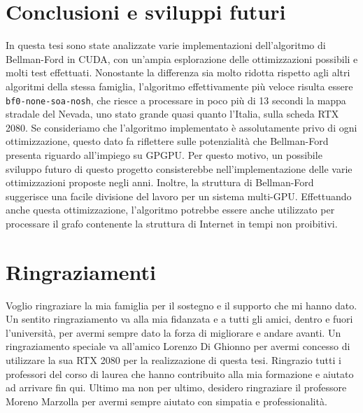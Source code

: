 \documentclass[12pt,a4paper,oneside]{book}
\begin{document}
	\chapter*{Conclusioni e sviluppi futuri}
	In questa tesi sono state analizzate varie implementazioni dell'algoritmo di Bellman-Ford in CUDA, con un'ampia esplorazione delle ottimizzazioni possibili e molti test effettuati. Nonostante la differenza sia molto ridotta rispetto agli altri algoritmi della stessa famiglia, l'algoritmo effettivamente più veloce risulta essere \texttt{bf0-none-soa-nosh}, che riesce a processare in poco più di 13 secondi la mappa stradale del Nevada, uno stato grande quasi quanto l'Italia, sulla scheda RTX 2080. Se consideriamo che l'algoritmo implementato è assolutamente privo di ogni ottimizzazione, questo dato fa riflettere sulle potenzialità che Bellman-Ford presenta riguardo all'impiego su GPGPU. Per questo motivo, un possibile sviluppo futuro di questo progetto consisterebbe nell'implementazione delle varie ottimizzazioni proposte negli anni. Inoltre, la struttura di Bellman-Ford suggerisce una facile divisione del lavoro per un sistema multi-GPU. Effettuando anche questa ottimizzazione, l'algoritmo potrebbe essere anche utilizzato per processare il grafo contenente la struttura di Internet in tempi non proibitivi.
	
	\printbibliography
	
	\chapter*{Ringraziamenti}
	Voglio ringraziare la mia famiglia per il sostegno e il supporto che mi hanno dato. Un sentito ringraziamento va alla mia fidanzata e a tutti gli amici, dentro e fuori l'università, per avermi sempre dato la forza di migliorare e andare avanti. Un ringraziamento speciale va all'amico Lorenzo Di Ghionno per avermi concesso di utilizzare la sua RTX 2080 per la realizzazione di questa tesi. Ringrazio tutti i professori del corso di laurea che hanno contribuito alla mia formazione e aiutato ad arrivare fin qui. Ultimo ma non per ultimo, desidero ringraziare il professore Moreno Marzolla per avermi sempre aiutato con simpatia e professionalità.
	
\end{document}
